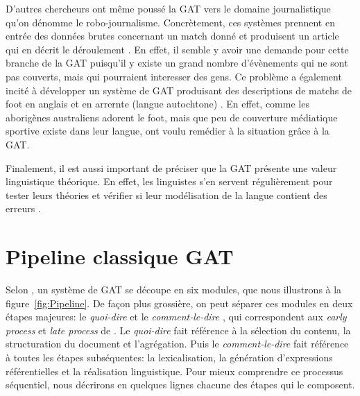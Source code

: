 D'autres chercheurs ont même poussé la \ac{GAT} vers le domaine journalistique qu'on dénomme le robo-journalisme. Concrètement, ces systèmes prennent en entrée des données brutes concernant un match donné et produisent un article qui en décrit le déroulement \citep{W17-3513}. En effet, il semble y avoir une demande pour cette branche de la \ac{GAT} puisqu'il y existe un grand nombre d'évènements qui ne sont pas couverts, mais qui pourraient interesser des gens. Ce problème a également incité \cite{lareau11a} à développer un système de \ac{GAT} produisant des descriptions de matchs de foot en anglais et en arrernte (langue autochtone) \citep{dras12}. En effet, comme les aborigènes australiens adorent le foot, mais que peu de couverture médiatique sportive existe dans leur langue, \cite{lareau11a} ont voulu remédier à la situation grâce à la \ac{GAT}.

Finalement, il est aussi important de préciser que la \ac{GAT} présente une valeur linguistique théorique. En effet, les linguistes s'en servent régulièrement pour tester leurs théories et vérifier si leur modélisation de la langue contient des erreurs \citep{DanlosPresentationmodelegeneration1983}. 


\section{Pipeline classique GAT} \label{ppc}

Selon \cite{ReiterBuildingNaturalLanguage2000}, un système de \ac{GAT} se découpe en six modules, que nous illustrons à la figure~\ref{fig:Pipeline}. De façon plus grossière, on peut séparer ces modules en deux étapes majeures: le \emph{quoi-dire} et le \emph{comment-le-dire} \citep{DanlosPresentationmodelegeneration1983}, qui correspondent aux \emph{early process} et \emph{late process} de \cite{gatt18}. Le \emph{quoi-dire} fait référence à la sélection du contenu, la structuration du document et l'agrégation. Puis le \emph{comment-le-dire} fait référence à toutes les étapes subséquentes: la lexicalisation, la génération d'expressions référentielles et la réalisation linguistique. Pour mieux comprendre ce processus séquentiel, nous décrirons en quelques lignes chacune des étapes qui le composent.

